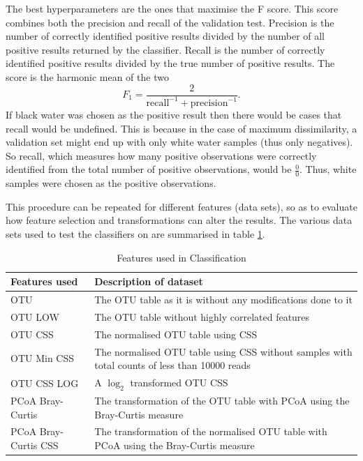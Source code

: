 The best hyperparameters are the ones that maximise the F score. This score combines both the precision and recall of the validation test. Precision is the number of correctly identified positive results divided by the number of all positive results returned by the classifier. Recall is the number of correctly identified positive results divided by the true number of positive results. The score is the harmonic mean of the two
\begin{equation}
	F_1 = \frac{2}{\text{recall}^{-1} + \text{precision}^{-1}}.
\end{equation} 
If black water was chosen as the positive result then there would be cases that recall would be undefined. This is because in the case of maximum dissimilarity, a validation set might end up with only white water samples (thus only negatives). So recall, which measures how many positive observations were correctly identified from the total number of positive observations, would be $\frac{0}{0}$. Thus, white samples were chosen as the positive observations.

This procedure can be repeated for different features (data sets), so as to evaluate how feature selection and transformations can alter the results.
 The various data sets used to test the classifiers on are summarised in table \ref{table:features}.
\begin{table}
	\caption{Features used in Classification}
	\centering
	\label{table:features}
	\begin{tabularx}{\textwidth}{l X  }
		\hline 
		Features used &Description of dataset\\ 
		
		\hline
		OTU &The OTU table as it is without any modifications done to it \\
		OTU LOW & The OTU table without highly correlated features\\
		OTU CSS & The normalised OTU table using CSS\\
		OTU Min CSS & The normalised OTU table using CSS without samples with total counts of less than 10000 reads  \\
		OTU CSS LOG & A $\log_2$ transformed OTU CSS \\
		PCoA Bray-Curtis &The transformation of the OTU table with PCoA using the Bray-Curtis measure  \\
		PCoA Bray-Curtis CSS &The transformation of the normalised OTU table with PCoA using the Bray-Curtis measure\\
		
		\hline 
	\end{tabularx}
\end{table}


